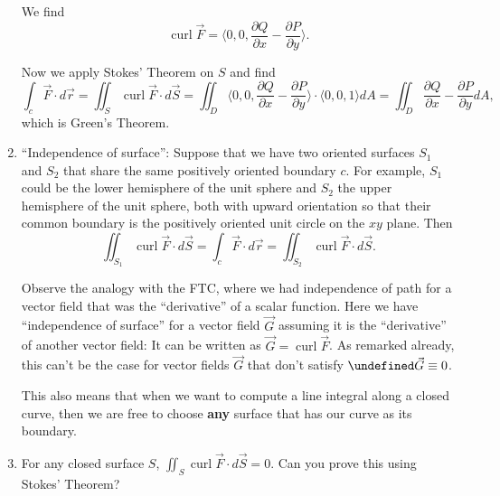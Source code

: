 \documentclass[12pt]{article}
\newcommand{\p}{\partial}
\newcommand{\vr}{\vec{r}{}}
\newcommand{\vF}{\vec{F}}
\renewcommand{\lg}{\langle}
\newcommand{\rg}{\rangle}
\newcommand{\Q}{\frac{\p Q}{\p x}}
\renewcommand{\P}{\frac{\p P}{\p y}}
\newcommand{\Fline}{\vF\cdot d\vr}
\DeclareMathOperator{\curl}{curl}
\newcommand{\vS}{\vec{S}}
\let \div \undefined
\DeclareMathOperator{\div}{div}
\begin{document}
\begin{enumerate}
We find $$\curl \vF=\lg 0,0, \Q-\P\rg.$$

Now we apply Stokes' Theorem on $S$ and find $$\int_c \vF \cdot d\vr=\iint_S\curl\vF\cdot d\vS=\iint_D\lg 0,0, \Q-\P\rg\cdot \lg 0,0,1\rg dA=\iint_D \Q-\P dA,$$
which is Green's Theorem.


\item ``Independence of surface'': Suppose that we have two oriented surfaces $S_1$ and $S_2$ that share the same positively oriented boundary $c$. For example, $S_1$ could be the lower hemisphere of the unit sphere and $S_2$ the upper hemisphere of the unit sphere, both with upward orientation so that their common boundary is the positively oriented unit circle on the $xy$ plane. Then $$\iint_{S_1}\curl\vF\cdot d \vS=\int_c\Fline =\iint_{S_2}\curl\vF\cdot d \vS.$$

Observe the analogy with the FTC, where we had independence of path for a vector field that was the ``derivative'' of a scalar function. Here we have ``independence of surface'' for a vector field $\vec{G}$ assuming it is the ``derivative'' of another vector field: It can be written as $\vec{G} =\curl\vF$. As remarked already, this can't be the case for vector fields $\vec{G}$ that don't satisfy $\div \vec{G}\equiv 0$.

This also means that when we want to compute a line integral along a closed curve, then we are free to choose \textbf{any} surface that has our curve as its boundary.


\item For any closed surface $S$, $\iint_S\curl\vF\cdot d\vS=0$. Can you prove this using Stokes' Theorem?




\end{enumerate}
\end{document}
